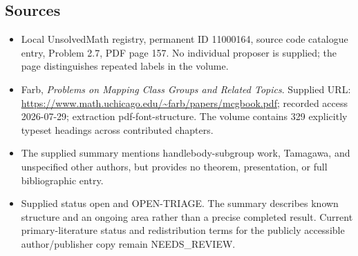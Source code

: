 \documentclass[11pt]{article}
\begin{document}
\subsection{Sources}
\begin{itemize}
\item Local UnsolvedMath registry, permanent ID 11000164, source code catalogue entry, Problem 2.7, PDF page 157. No individual proposer is supplied; the page distinguishes repeated labels in the volume.
\item Farb, \emph{Problems on Mapping Class Groups and Related Topics}. Supplied URL: \url{https://www.math.uchicago.edu/~farb/papers/mcgbook.pdf}; recorded access 2026-07-29; extraction pdf-font-structure. The volume contains 329 explicitly typeset headings across contributed chapters.
\item The supplied summary mentions handlebody-subgroup work, Tamagawa, and unspecified other authors, but provides no theorem, presentation, or full bibliographic entry.
\item Supplied status open and OPEN-TRIAGE. The summary describes known structure and an ongoing area rather than a precise completed result. Current primary-literature status and redistribution terms for the publicly accessible author/publisher copy remain NEEDS\_REVIEW.
\end{itemize}
\end{document}
